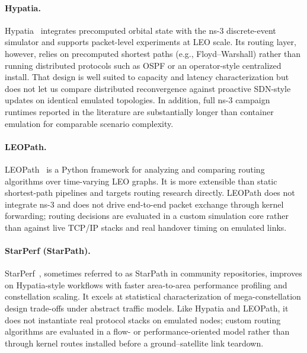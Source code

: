 \paragraph{Hypatia.}
Hypatia~\cite{kassing2020exploring} integrates precomputed orbital state with
the ns-3 discrete-event simulator and supports packet-level experiments at LEO
scale.
Its routing layer, however, relies on precomputed shortest paths (e.g.,
Floyd--Warshall) rather than running distributed protocols such as OSPF or an
operator-style centralized install.
That design is well suited to capacity and latency characterization but does
not let us compare distributed reconvergence against proactive SDN-style
updates on identical emulated topologies.
In addition, full ns-3 campaign runtimes reported in the literature are
substantially longer than container emulation for comparable scenario
complexity.

\paragraph{LEOPath.}
LEOPath~\cite{leopath2024} is a Python framework for analyzing and comparing
routing algorithms over time-varying LEO graphs.
It is more extensible than static shortest-path pipelines and targets routing
research directly.
LEOPath does not integrate ns-3 and does not drive end-to-end packet exchange
through kernel forwarding; routing decisions are evaluated in a custom
simulation core rather than against live TCP/IP stacks and real handover
timing on emulated links.

\paragraph{StarPerf (StarPath).}
StarPerf~\cite{lai2020starperf}, sometimes referred to as StarPath in
community repositories, improves on Hypatia-style workflows with faster
area-to-area performance profiling and constellation scaling.
It excels at statistical characterization of mega-constellation design
trade-offs under abstract traffic models.
Like Hypatia and LEOPath, it does not instantiate real protocol stacks on
emulated nodes; custom routing algorithms are evaluated in a flow- or
performance-oriented model rather than through kernel routes installed before
a ground--satellite link teardown.

